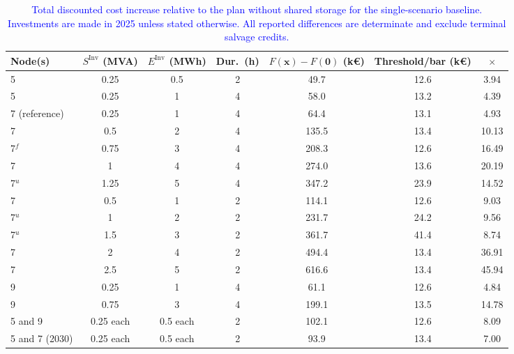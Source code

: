 \documentclass[preprint,12pt]{elsarticle}
\begin{document}
\begin{table}[htbp!]
    \centering
    \caption{\textcolor{blue}{Total discounted cost increase relative to the plan without shared storage for the single-scenario baseline. Investments are made in 2025 unless stated otherwise. All reported differences are determinate and exclude terminal salvage credits.}}
    \label{tab:res_value_ladder}
    \scriptsize\setlength{\tabcolsep}{3pt}
    \begin{tabular}{l c c c c c c}
        \toprule
        Node(s) & $S^{\text{Inv}}$ (MVA) & $E^{\text{Inv}}$ (MWh) & Dur.\ (h) & $F(\boldsymbol{x}) - F(\boldsymbol{0})$ (k\euro) & Threshold/bar (k\euro) & $\times$ \\
        \midrule
        5                 & 0.25 & 0.5 & 2 & 49.7  & 12.6 & 3.94  \\
        5                 & 0.25 & 1   & 4 & 58.0  & 13.2 & 4.39  \\
        7 (reference)     & 0.25 & 1   & 4 & 64.4  & 13.1 & 4.93  \\
        7                 & 0.5  & 2   & 4 & 135.5 & 13.4 & 10.13 \\
        7$^{f}$           & 0.75 & 3   & 4 & 208.3 & 12.6 & 16.49 \\
        7                 & 1    & 4   & 4 & 274.0 & 13.6 & 20.19 \\
        7$^{u}$           & 1.25 & 5   & 4 & 347.2 & 23.9 & 14.52 \\
        7                 & 0.5  & 1   & 2 & 114.1 & 12.6 & 9.03  \\
        7$^{u}$           & 1    & 2   & 2 & 231.7 & 24.2 & 9.56  \\
        7$^{u}$           & 1.5  & 3   & 2 & 361.7 & 41.4 & 8.74  \\
        7                 & 2    & 4   & 2 & 494.4 & 13.4 & 36.91 \\
        7                 & 2.5  & 5   & 2 & 616.6 & 13.4 & 45.94 \\
        9                 & 0.25 & 1   & 4 & 61.1  & 12.6 & 4.84  \\
        9                 & 0.75 & 3   & 4 & 199.1 & 13.5 & 14.78 \\
        5 and 9           & 0.25 each & 0.5 each & 2 & 102.1 & 12.6 & 8.09 \\
        5 and 7 (2030)    & 0.25 each & 0.5 each & 2 & 93.9  & 13.4 & 7.00 \\
        \bottomrule
    \end{tabular}
    \par\smallskip

\end{table}
\end{document}
